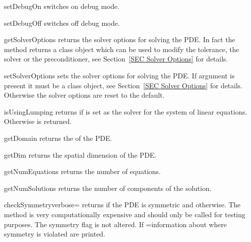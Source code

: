 \begin{methoddesc}[LinearPDE]{setDebugOn}{}
switches on debug mode.
\end{methoddesc}

\begin{methoddesc}[LinearPDE]{setDebugOff}{}
switches off debug mode.
\end{methoddesc}

\begin{methoddesc}[LinearPDE]{getSolverOptions}{}
returns the solver options for solving the PDE. In fact the method returns
a \SolverOptions class object which can be used to modify the tolerance, 
the solver or the preconditioner, see Section~\ref{SEC Solver Options} for details.
\end{methoddesc}

\begin{methoddesc}[LinearPDE]{setSolverOptions}{}
sets the solver options for solving the PDE. If argument  is present it
must be a \SolverOptions class object, see Section~\ref{SEC Solver Options} for details. Otherwise the solver options are reset to the default.
\end{methoddesc}


\begin{methoddesc}[LinearPDE]{isUsingLumping}{}
returns \True if \LUMPING is set as the solver for the system of linear equations.
Otherwise \False is returned.
\end{methoddesc}


\begin{methoddesc}[LinearPDE]{getDomain}{}
returns the \Domain of the PDE.
\end{methoddesc}

\begin{methoddesc}[LinearPDE]{getDim}{}
returns the spatial dimension of the PDE.
\end{methoddesc}

\begin{methoddesc}[LinearPDE]{getNumEquations}{}
returns the number of equations.
\end{methoddesc}

\begin{methoddesc}[LinearPDE]{getNumSolutions}{}
returns the number of components of the solution.
\end{methoddesc}

\begin{methoddesc}[LinearPDE]{checkSymmetry}{verbose=\False}
returns \True if the PDE is symmetric and \False otherwise.
The method is very computationally expensive and should only be
called for testing purposes. The symmetry flag is not altered.
If =\True information about where symmetry is violated
are printed.
\end{methoddesc}

